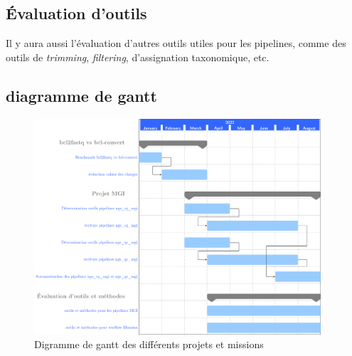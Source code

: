 \subsection{Évaluation d'outils}
Il y aura aussi l'évaluation d'autres outils utiles pour les pipelines, comme des outils de \emph{trimming}, \emph{filtering}, d'assignation taxonomique, etc.


\subsection{diagramme de gantt}
\begin{figure}[H]
    \centering
    \includegraphics[width=0.95\textwidth]{digramme_gant/diag_gantt.png}
    \caption{Digramme de gantt des différents projets et missions}
    \label{diag-gantt}
\end{figure}